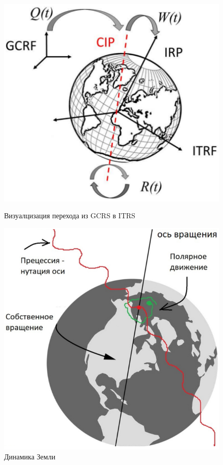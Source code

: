 \begin{figure}[h!]
    \begin{minipage}[c]{0.45\textwidth}
        \centering
        \includegraphics[width=\linewidth]{../images/review/qrw.png}
        \caption{Визуалцизация перехода из GCRS в ITRS}
        \label{fig:qrw}
    \end{minipage}
    \hfill
    \begin{minipage}[c]{0.45\textwidth}
        \centering
        \includegraphics[width=\linewidth]{../images/review/gcrs_itrs.png}
        \caption{Динамика Земли}
        \label{fig:gcrs_itrs}
    \end{minipage}
\end{figure}

